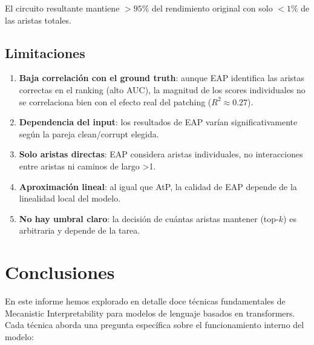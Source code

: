 \documentclass[11pt,a4paper]{report}
\theoremstyle{definition}
\begin{document}
El circuito resultante mantiene $>95\%$ del rendimiento original con solo $<1\%$ de las aristas totales.

\section{Limitaciones}

\begin{enumerate}
    \item \textbf{Baja correlación con el ground truth}: aunque EAP identifica las aristas correctas en el ranking (alto AUC), la magnitud de los scores individuales no se correlaciona bien con el efecto real del patching ($R^2 \approx 0.27$).
    \item \textbf{Dependencia del input}: los resultados de EAP varían significativamente según la pareja clean/corrupt elegida.
    \item \textbf{Solo aristas directas}: EAP considera aristas individuales, no interacciones entre aristas ni caminos de largo >1.
    \item \textbf{Aproximación lineal}: al igual que AtP, la calidad de EAP depende de la linealidad local del modelo.
    \item \textbf{No hay umbral claro}: la decisión de cuántas aristas mantener (top-$k$) es arbitraria y depende de la tarea.
\end{enumerate}

\newpage

\chapter{Conclusiones}

En este informe hemos explorado en detalle doce técnicas fundamentales de Mecanistic Interpretability para modelos de lenguaje basados en transformers. Cada técnica aborda una pregunta específica sobre el funcionamiento interno del modelo:
\end{document}
